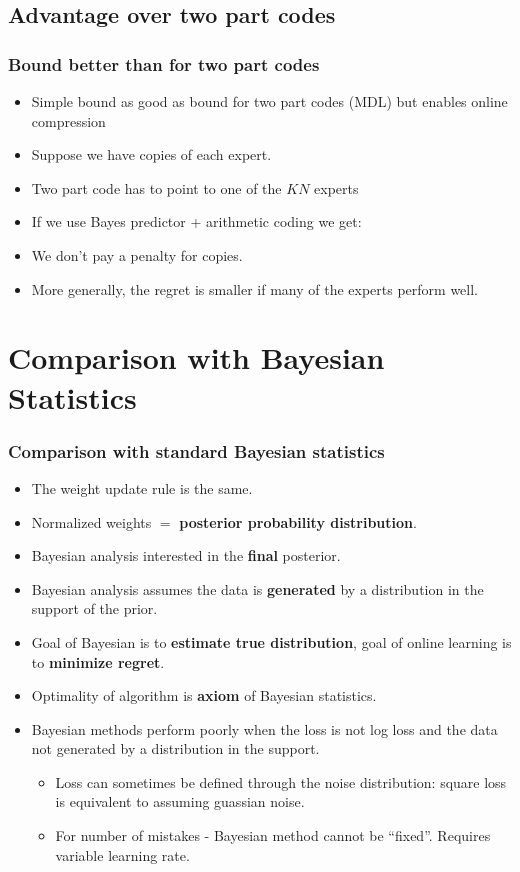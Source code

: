 \documentclass[handout]{beamer}
\newcommand{\R}[1]{{\color{red}{#1}}}
\begin{document}
\subsection{Advantage over two part codes}

\begin{frame}
\frametitle{Bound better than for two part codes}
\begin{itemize}
\item
Simple bound as good as bound for two part codes (MDL) 
but enables online compression
\item Suppose we have \R{$K$} copies of each expert.
\item Two part code has to point to one of the $KN$ experts
\R{$ L_A \leq \log NK + \min_i L_i^T = \log NK + \min_i L_i^T$}
\item If we use Bayes predictor + arithmetic coding we get:
\R{$$ L_A = -\log W^{T+1} \leq \log  K \max_i \frac{1}{NK} e^{-L_i^T} 
=\log N + \min_i L_i^T $$}
\item We don't pay a penalty for copies.
\item More generally, the regret is smaller if many of the experts perform well.
\end{itemize}
\end{frame}


\section{Comparison with Bayesian Statistics}

\begin{frame}
\frametitle{Comparison with standard Bayesian statistics}
\begin{itemize}
\item The weight update rule is the same.
\item Normalized weights $=$ {\bf posterior probability  distribution}.
\item Bayesian analysis interested in the {\bf final} posterior.
\item Bayesian analysis assumes the data is {\bf generated} 
by a distribution in the support of the prior.
\item Goal of Bayesian is to {\bf estimate true distribution}, 
goal of online learning is to {\bf minimize regret}.
\item Optimality of algorithm is {\bf axiom} of Bayesian statistics.
\item Bayesian methods perform poorly when the loss is not log loss
  and the data not generated by a distribution in the support.
\begin{itemize}
\item
Loss can sometimes be defined through the noise distribution: square loss is equivalent to assuming guassian noise.
\item
For number of mistakes - Bayesian method cannot be ``fixed''. Requires variable learning rate.
\end{itemize}
\end{itemize}
\end{frame}
\end{document}
